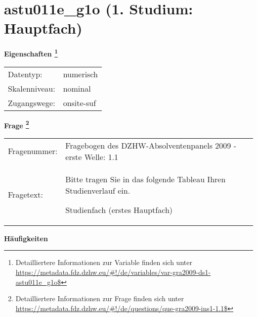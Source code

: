 
    \setcounter{footnote}{0}

    \vspace*{-1.8cm}
	\section{astu011e\_g1o (1. Studium: Hauptfach)}
	\label{section:astu011e_g1o}



    \vspace*{0.5cm}
    \noindent\textbf{Eigenschaften
	\footnote{Detailliertere Informationen zur Variable finden sich unter
		\url{https://metadata.fdz.dzhw.eu/\#!/de/variables/var-gra2009-ds1-astu011e_g1o$}}}\\
	\begin{tabularx}{\hsize}{@{}lX}
	Datentyp: & numerisch \\
	Skalenniveau: & nominal \\
	Zugangswege: &
	  onsite-suf
 \\
    \end{tabularx}



				\vspace*{0.5cm}
                \noindent\textbf{Frage
	                \footnote{Detailliertere Informationen zur Frage finden sich unter
		              \url{https://metadata.fdz.dzhw.eu/\#!/de/questions/que-gra2009-ins1-1.1$}}}\\
				\begin{tabularx}{\hsize}{@{}lX}
					Fragenummer: &
					  Fragebogen des DZHW-Absolventenpanels 2009 - erste Welle:
					  1.1
 \\
					Fragetext: & Bitte tragen Sie in das folgende Tableau Ihren Studienverlauf ein.\par  Studienfach (erstes Hauptfach) \\
				\end{tabularx}





        		\vspace*{0.5cm}
                \noindent\textbf{Häufigkeiten}


